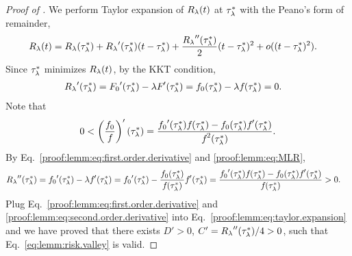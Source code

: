 \begin{proof}[Proof of ]

We perform Taylor expansion of ${R_{\lambda}}({t})$ at ${\tau^*_\lambda}$ with the Peano's form of remainder,    \begin{align}\label{proof:lemm:eq:taylor.expansion}
        {R_{\lambda}}({t})
        &= {R_{\lambda}}({\tau^*_\lambda}) + {R_{\lambda}}'({\tau^*_\lambda}) ({t} - {\tau^*_\lambda}) + \frac{{R_{\lambda}}''({\tau^*_\lambda})}{2}({t} - {\tau^*_\lambda})^2
        + o(({t} - {\tau^*_\lambda})^2).
    \end{align}
    Since ${\tau^*_\lambda}$ minimizes ${R_{\lambda}}({t})$, by the KKT condition,    \begin{align}\label{proof:lemm:eq:first.order.derivative}
        {R_{\lambda}}'({\tau^*_\lambda})
        &= {F_{0}}'({\tau^*_\lambda}) - \lambda {F_{}}'({\tau^*_\lambda})
        = {f_{0}}({\tau^*_\lambda}) - \lambda {f_{}}({\tau^*_\lambda})
        = 0.
    \end{align}
    Note that
    \begin{align}\label{proof:lemm:eq:MLR}
        0 < \left(\frac{{f_{0}}}{{f_{}}}\right)'({\tau^*_\lambda})
        = \frac{{f_{0}}'{}({\tau^*_\lambda}) {f_{}}({\tau^*_\lambda}) - {f_{0}}{}({\tau^*_\lambda}) {f_{}}'({\tau^*_\lambda})}{{f_{}}^2({\tau^*_\lambda})}.
    \end{align}
    By Eq.~\eqref{proof:lemm:eq:first.order.derivative} and \eqref{proof:lemm:eq:MLR},
    \begin{align}\label{proof:lemm:eq:second.order.derivative}
    \begin{split}
    {R_{\lambda}}''({\tau^*_\lambda})
    &= {f_{0}}'({\tau^*_\lambda}) - \lambda {f_{}}'({\tau^*_\lambda})
    = {f_{0}}'({\tau^*_\lambda})
    - \frac{{f_{0}}({\tau^*_\lambda})}{{f_{}}({\tau^*_\lambda})} {f_{}}'({\tau^*_\lambda})
    = \frac{{f_{0}}'({\tau^*_\lambda})
     {f_{}}({\tau^*_\lambda}) - {f_{0}}({\tau^*_\lambda}) {f_{}}'({\tau^*_\lambda})}{{f_{}}({\tau^*_\lambda})}
     >0.
     \end{split}
    \end{align}
    Plug Eq.~\eqref{proof:lemm:eq:first.order.derivative} and \eqref{proof:lemm:eq:second.order.derivative} into Eq.~\eqref{proof:lemm:eq:taylor.expansion} and we have proved that there exists $D' > 0$, $C' = {R_{\lambda}}''({\tau^*_\lambda})/4 > 0$, such that Eq.~\eqref{eq:lemm:risk.valley} is valid.
\end{proof}

